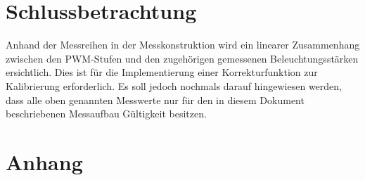 \documentclass[a4paper,12pt]{scrartcl}
\begin{document}
\clearpage
\section{Schlussbetrachtung}
Anhand der Messreihen in der Messkonstruktion wird ein linearer Zusammenhang zwischen den PWM-Stufen und den zugehörigen gemessenen Beleuchtungsstärken ersichtlich. Dies ist für die Implementierung einer Korrekturfunktion zur Kalibrierung erforderlich. Es soll jedoch nochmals darauf hingewiesen werden, dass alle oben genannten Messwerte nur für den in diesem Dokument beschriebenen Messaufbau Gültigkeit besitzen.


\section{Anhang}
\end{document}
